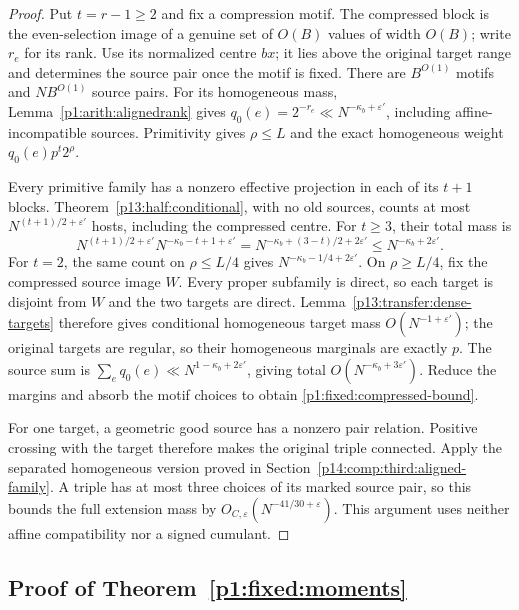 \begin{proof}
Put $t=r-1\ge2$ and fix a compression motif. The compressed block
is the even-selection image of a genuine set of $O(B)$ values of
width $O(B)$; write $r_e$ for its rank.
Use its normalized centre $bx$; it lies above the original target
range and determines the source pair once the motif is fixed.
There are $B^{O(1)}$ motifs and $NB^{O(1)}$ source pairs.
For its homogeneous mass, Lemma~\ref{p1:arith:alignedrank} gives
$q_0(e)=2^{-r_e}\ll N^{-\kappa_b+\varepsilon'}$, including
affine-incompatible sources. Primitivity gives $\rho\le L$ and
the exact homogeneous weight $q_0(e)p^t2^\rho$.

Every primitive family has a nonzero effective projection in each
of its $t+1$ blocks. Theorem~\ref{p13:half:conditional}, with no old
sources, counts at most $N^{(t+1)/2+\varepsilon'}$ hosts,
including the compressed centre. For $t\ge3$, their total mass is
\[
 N^{(t+1)/2+\varepsilon'}N^{-\kappa_b-t+1+\varepsilon'}
   =N^{-\kappa_b+(3-t)/2+2\varepsilon'}
   \le N^{-\kappa_b+2\varepsilon'}.
\]
For $t=2$, the same count on $\rho\le L/4$ gives
$N^{-\kappa_b-1/4+2\varepsilon'}$.
On $\rho\ge L/4$, fix the compressed source image $W$.
Every proper subfamily is direct, so each target is disjoint from
$W$ and the two targets are direct. Lemma~\ref{p13:transfer:dense-targets}
therefore gives conditional homogeneous target mass
$O(N^{-1+\varepsilon'})$; the original targets are regular, so their
homogeneous marginals are exactly $p$.
The source sum is $\sum_e q_0(e)\ll N^{1-\kappa_b+2\varepsilon'}$,
giving total $O(N^{-\kappa_b+3\varepsilon'})$.
Reduce the margins and absorb the motif choices to obtain
\eqref{p1:fixed:compressed-bound}.

For one target, a geometric good source has a nonzero pair relation.
Positive crossing with the target therefore makes the original triple
connected. Apply the separated homogeneous version proved in
Section~\ref{p14:comp:third:aligned-family}. A triple has at most three
choices of its marked source pair, so this bounds the full extension
mass by $O_{C,\varepsilon}(N^{-41/30+\varepsilon})$.
This argument uses neither affine compatibility nor a signed cumulant.
\end{proof}

\subsection{Proof of Theorem~\ref{p1:fixed:moments}}
\label{p14:comp:fixed-moments}

